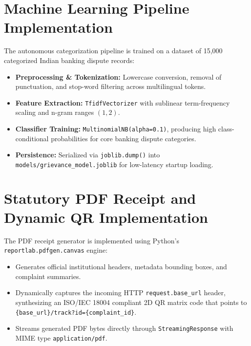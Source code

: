 \section{Machine Learning Pipeline Implementation}
The autonomous categorization pipeline is trained on a dataset of 15,000 categorized Indian banking dispute records:
\begin{itemize}
    \item \textbf{Preprocessing \& Tokenization:} Lowercase conversion, removal of punctuation, and stop-word filtering across multilingual tokens.
    \item \textbf{Feature Extraction:} \texttt{TfidfVectorizer} with sublinear term-frequency scaling and n-gram ranges $(1, 2)$.
    \item \textbf{Classifier Training:} \texttt{MultinomialNB(alpha=0.1)}, producing high class-conditional probabilities for core banking dispute categories.
    \item \textbf{Persistence:} Serialized via \texttt{joblib.dump()} into \texttt{models/grievance\_model.joblib} for low-latency startup loading.
\end{itemize}

\section{Statutory PDF Receipt and Dynamic QR Implementation}
The PDF receipt generator is implemented using Python's \texttt{reportlab.pdfgen.canvas} engine:
\begin{itemize}
    \item Generates official institutional headers, metadata bounding boxes, and complaint summaries.
    \item Dynamically captures the incoming HTTP \texttt{request.base\_url} header, synthesizing an ISO/IEC 18004 compliant 2D QR matrix code that points to \texttt{\{base\_url\}/track?id=\{complaint\_id\}}.
    \item Streams generated PDF bytes directly through \texttt{StreamingResponse} with MIME type \texttt{application/pdf}.
\end{itemize}

